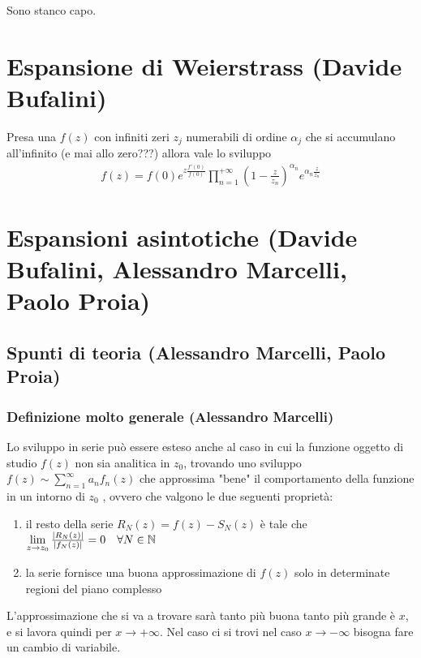 Sono stanco capo.




\section{Espansione di Weierstrass (Davide Bufalini)}
Presa una $f(z)$ con infiniti zeri $z_j$ numerabili di ordine $\alpha_j$ che si accumulano all'infinito (e mai allo zero???) allora vale lo sviluppo
\begin{align}
	f(z) =f(0) e^{z\frac{f'(0)}{f(0)}} \prod_{n=1}^{+\infty}\left( 1 - \frac{z}{z_n} \right)^{\alpha_n} e^{\alpha_n \frac{z}{z_n}}
\end{align}

\newpage

\section{Espansioni asintotiche (Davide Bufalini, Alessandro Marcelli, Paolo Proia)}

\subsection{Spunti di teoria (Alessandro Marcelli, Paolo Proia)}

\subsubsection{Definizione molto generale (Alessandro Marcelli)}

Lo sviluppo in serie può essere esteso anche al caso in cui la funzione oggetto di studio $f(z)$ non sia analitica in $z_0$, trovando uno sviluppo $f(z) \sim \sum_{n=1}^{\infty} a_n f_n(z)$ che approssima "bene" il comportamento della funzione in un intorno di $z_0$ \cite{MMF}, ovvero che valgono le due seguenti proprietà:
\begin{enumerate}
	\item il resto della serie $R_N(z) = f(z) - S_N(z)$ è tale che $\underset{z \rightarrow z_0}{\lim} \, \frac{|R_N(z)|}{|f_N(z)|} = 0 \quad \forall N\in \mathbb{N}$
	\item la serie fornisce una buona approssimazione di $f(z)$ solo in determinate regioni del piano complesso
\end{enumerate}
L'approssimazione che si va a trovare sarà tanto più buona tanto più grande è $x$, e si lavora quindi per $x \to + \infty$. Nel caso ci si trovi nel caso $x \to -\infty$ bisogna fare un cambio di variabile.

